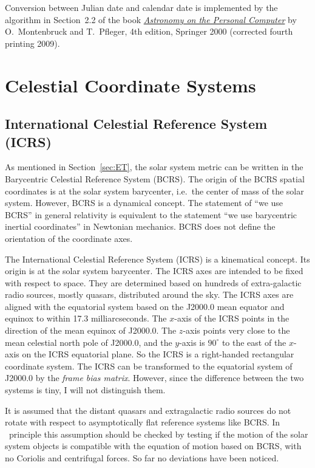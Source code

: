 \documentclass[12pt]{article}
\begin{document}
Conversion between Julian date and calendar date is implemented by the algorithm 
in Section~2.2 of the book \href{https://www.springer.com/us/book/9783540672210#}
{\it Astronomy on the Personal Computer} by 
O.~Montenbruck and T.~Pfleger, 4th edition, Springer 2000 (corrected fourth 
printing 2009).

\section{Celestial Coordinate Systems}
\label{sec:coordSys}

\subsection{International Celestial Reference System (ICRS)} 

As mentioned in Section~\ref{sec:ET}, the solar system metric can be 
written in the Barycentric Celestial Reference System (BCRS). The origin of the 
BCRS spatial coordinates is at the solar system barycenter, i.e.\ the center 
of mass of the solar system. However, BCRS is a dynamical concept. The 
statement of ``we use BCRS'' in general relativity is equivalent to the 
statement ``we use barycentric inertial coordinates'' in Newtonian 
mechanics. BCRS does not define the orientation of the coordinate axes. 

The International Celestial Reference System (ICRS) is a kinematical concept. Its 
origin is at the solar system barycenter. The ICRS axes are intended to be 
fixed with respect to space. They are 
determined based on hundreds of extra-galactic radio sources, mostly quasars, distributed 
around the sky. The ICRS axes are aligned with the equatorial system based on 
the J2000.0 mean equator and equinox to within 17.3 milliarcseconds. The $x$-axis 
of the ICRS points in the direction of the mean equinox of J2000.0. The $z$-axis 
points very close to the mean celestial north pole of J2000.0, and the $y$-axis 
is $90^\circ$ to the east of the $x$-axis on the ICRS equatorial plane. So the ICRS 
is a right-handed rectangular coordinate system. The ICRS can be transformed to the 
equatorial system of J2000.0 by the {\em frame bias matrix}. However, since the 
difference between the two systems is tiny, I will not distinguish them.

It is assumed that the distant quasars and extragalactic radio sources do not 
rotate with respect to asymptotically flat reference systems like BCRS. In \
principle this assumption should be checked by testing if the motion of 
the solar system objects is compatible with the equation of motion based 
on BCRS, with no Coriolis and centrifugal forces. So far no deviations have been 
noticed. 
\end{document}
